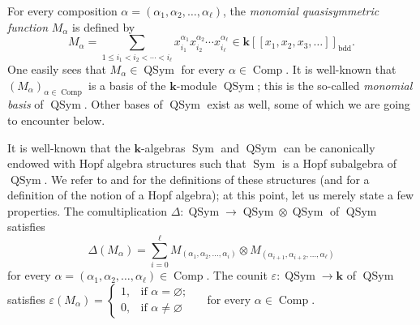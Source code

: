 \documentclass
[numbers=enddot,12pt,final,onecolumn,notitlepage,abstracton]{scrartcl}%
\theoremstyle{definition}
\let\sumnonlimits\sum
\renewcommand{\sum}{\sumnonlimits\limits}
\begin{document}
For every composition $\alpha=\left(  \alpha_{1},\alpha_{2},\ldots
,\alpha_{\ell}\right)  $, the \textit{monomial quasisymmetric function}
$M_{\alpha}$ is defined by%
\[
M_{\alpha}=\sum_{1\leq i_{1}<i_{2}<\cdots<i_{\ell}}x_{i_{1}}^{\alpha_{1}%
}x_{i_{2}}^{\alpha_{2}}\cdots x_{i_{\ell}}^{\alpha_{\ell}}\in\mathbf{k}\left[
\left[  x_{1},x_{2},x_{3},\ldots\right]  \right]  _{\operatorname*{bdd}}.
\]
One easily sees that $M_{\alpha}\in\operatorname*{QSym}$ for every $\alpha
\in\operatorname*{Comp}$. It is well-known that $\left(  M_{\alpha}\right)
_{\alpha\in\operatorname*{Comp}}$ is a basis of the $\mathbf{k}$-module
$\operatorname*{QSym}$; this is the so-called \textit{monomial basis} of
$\operatorname*{QSym}$. Other bases of $\operatorname*{QSym}$ exist as well,
some of which we are going to encounter below.

It is well-known that the $\mathbf{k}$-algebras $\operatorname*{Sym}$ and
$\operatorname*{QSym}$ can be canonically endowed with Hopf algebra structures
such that $\operatorname*{Sym}$ is a Hopf subalgebra of $\operatorname*{QSym}%
$. We refer to \cite[Chapters 4 and 6]{HGK} and \cite[Chapters 2 and
5]{Reiner} for the definitions of these structures (and for a definition of
the notion of a Hopf algebra); at this point, let us merely state a few
properties. The comultiplication $\Delta:\operatorname*{QSym}\rightarrow
\operatorname*{QSym}\otimes\operatorname*{QSym}$ of $\operatorname*{QSym}$
satisfies%
\[
\Delta\left(  M_{\alpha}\right)  =\sum_{i=0}^{\ell}M_{\left(  \alpha
_{1},\alpha_{2},\ldots,\alpha_{i}\right)  }\otimes M_{\left(  \alpha
_{i+1},\alpha_{i+2},\ldots,\alpha_{\ell}\right)  }%
\]
for every $\alpha=\left(  \alpha_{1},\alpha_{2},\ldots,\alpha_{\ell}\right)
\in\operatorname*{Comp}$. The counit $\varepsilon:\operatorname*{QSym}%
\rightarrow\mathbf{k}$ of $\operatorname*{QSym}$ satisfies $\varepsilon\left(
M_{\alpha}\right)  =
\begin{cases}
1, & \text{if }\alpha=\varnothing;\\
0, & \text{if }\alpha\neq\varnothing
\end{cases}
\quad$ for every $\alpha\in\operatorname*{Comp}$.
\end{document}
